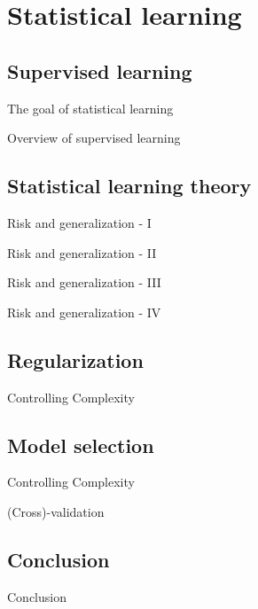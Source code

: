 
\section{Statistical learning}
\subsection{Supervised learning}
\begin{frame}[t]{The goal of statistical learning}

\end{frame}
\begin{frame}[t]{Overview of supervised learning}

\end{frame}
%


\subsection{Statistical learning theory}
\begin{frame}[t]{Risk and generalization - I}

\end{frame}
\begin{frame}[t]{Risk and generalization - II}

\end{frame}
\begin{frame}[t]{Risk and generalization - III}

\end{frame}
\begin{frame}[t]{Risk and generalization - IV}

\end{frame}
\subsection{Regularization}
\begin{frame}[t]{Controlling Complexity}

\end{frame}
%
\subsection{Model selection}
\begin{frame}[t]{Controlling Complexity}

\end{frame}
%
\begin{frame}[t]{(Cross)-validation}

\end{frame}
\subsection{Conclusion}
\begin{frame}[t]{Conclusion}

\end{frame}